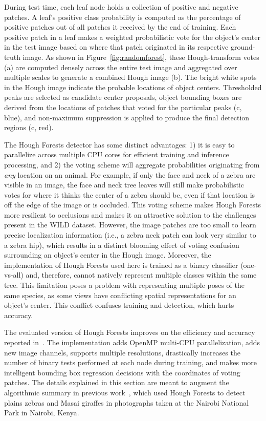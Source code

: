 During test time, each leaf node holds a collection of positive and negative patches.  A leaf's positive class probability is computed as the percentage of positive patches out of all patches it received by the end of training.  Each positive patch in a leaf makes a weighted probabilistic vote for the object's center in the test image based on where that patch originated in its respective ground-truth image.  As shown in Figure~\ref{fig:randomforest}, these Hough-transform votes (a) are computed densely across the entire test image and aggregated over multiple scales to generate a combined Hough image (b).  The bright white spots in the Hough image indicate the probable locations of object centers.  Thresholded peaks are selected as candidate center proposals, object bounding boxes are derived from the locations of patches that voted for the particular peaks (c, blue), and non-maximum suppression is applied to produce the final detection regions (c, red).

The Hough Forests detector has some distinct advantages: 1) it is easy to parallelize across multiple CPU cores for efficient training and inference processing, and 2) the voting scheme will aggregate probabilities originating from \textit{any} location on an animal.  For example, if only the face and neck of a zebra are visible in an image, the face and neck tree leaves will still make probabilistic votes for where it thinks the center of a zebra should be, even if that location is off the edge of the image or is occluded.  This voting scheme makes Hough Forests more resilient to occlusions and makes it an attractive solution to the challenges present in the WILD dataset.  However, the image patches are too small to learn precise localization information (i.e., a zebra neck patch can look very similar to a zebra hip), which results in a distinct blooming effect of voting confusion surrounding an object's center in the Hough image.  Moreover, the implementation of Hough Forests used here is trained as a binary classifier (one-vs-all) and, therefore, cannot natively represent multiple classes within the same tree.  This limitation poses a problem with representing multiple poses of the same species, as some views have conflicting spatial representations for an object's center.  This conflict confuses training and detection, which hurts accuracy.

The evaluated version of Hough Forests improves on the efficiency and accuracy reported in~\cite{gall_hough_2011}.  The implementation adds OpenMP\cite{openmp08} multi-CPU parallelization, adds new image channels, supports multiple resolutions, drastically increases the number of binary tests performed at each node during training, and makes more intelligent bounding box regression decisions with the coordinates of voting patches.  The details explained in this section are meant to augment the algorithmic summary in previous work~\cite{parham_photographic_2015}, which used Hough Forests to detect plains zebras and Masai giraffes in photographs taken at the Nairobi National Park in Nairobi, Kenya.

